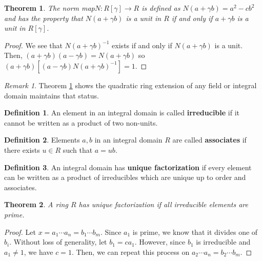 \documentclass{article}
\newtheorem{theorem}{Theorem}[definition]
\theoremstyle{definition}
\newtheorem{definition}{Definition}[section]
\theoremstyle{remark}
\newtheorem{remark}{Remark}[definition]
\begin{document}
\begin{theorem}
    \label{thm:norm map}
    The norm map\footnotemark $N:R[\gamma]\to R$ is defined as
    $N(a+\gamma b)=a^2-cb^2$ and has the property that $N(a+\gamma b)$ is a
    unit in $R$ if and only if $a+\gamma b$ is a unit in $R[\gamma]$.
\end{theorem}

\begin{proof}
    We see that $N(a+\gamma b)^{-1}$ exists if and only if $N(a+\gamma b)$ is a unit.
    Then, $(a+\gamma b)(a-\gamma b)=N(a+\gamma b)$ so
    $(a+\gamma b)\left[(a-\gamma b)N(a+\gamma b)^{-1}\right]=1$.
\end{proof}

\begin{remark}
    Theorem \ref{thm:norm map} shows the quadratic ring extension of any field
    or integral domain maintains that status.
\end{remark}

\begin{definition}
    An element in an integral domain is called \textbf{irreducible} if it
    cannot be written as a product of two non-units.
\end{definition}

\begin{definition}
    Elements $a,b$ in an integral domain $R$ are called \textbf{associates} if
    there exists $u\in R$ such that $a=ub$.
\end{definition}

\begin{definition}
    \label{def:unique factorization}
    An integral domain has \textbf{unique factorization} if every element can
    be written as a product of irreducibles which are unique up to order and
    associates.
\end{definition}

\begin{theorem}
    \label{thm:unique factorization}
    A ring $R$ has unique factorization if all irreducible elements are prime.
\end{theorem}

\begin{proof}
    Let $x=a_1\cdots a_n=b_1\cdots b_m$.
    Since $a_1$ is prime, we know that it divides one of $b_i$.
    Without loss of generality, let $b_1=ca_1$.
    However, since $b_1$ is irreducible and $a_1\neq 1$, we have $c=1$.
    Then, we can repeat this process on $a_2\cdots a_n=b_2\cdots b_m$.
\end{proof}
\end{document}
